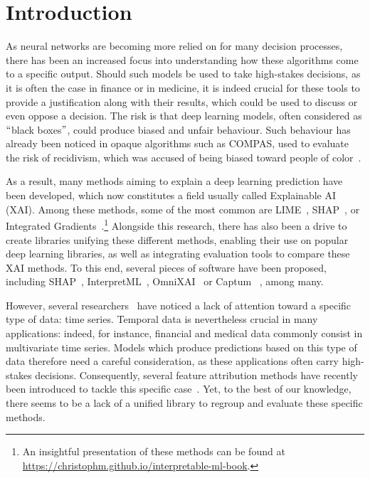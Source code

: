 \section{Introduction}
\label{sec:introduction}

As neural networks are becoming more relied on for many decision processes, there has been an increased focus into
understanding how these algorithms come to a specific output.
Should such models be used to take high-stakes decisions, as it is often the case in finance or in medicine, it is
indeed crucial for these tools to provide a justification along with their results, which could be used to discuss
or even oppose a decision.
The risk is that deep learning models, often considered as $``$black boxes$"$, could produce biased and unfair behaviour.
Such behaviour has already been noticed in opaque algorithms such as COMPAS, used to evaluate the risk of recidivism,
which was accused of being biased toward people of color~\citep{rudin2019stop}.

As a result, many methods aiming to explain a deep learning prediction have been developed, which now constitutes a
field usually called Explainable AI (XAI).
Among these methods, some of the most common are LIME~\citep{ribeiro2016should}, SHAP~\citep{lundberg2017unified},
or Integrated Gradients~\citep{sundararajan2017axiomatic}.\footnote{
    An insightful presentation of these methods can be found at \url{https://christophm.github.io/interpretable-ml-book}.
}
Alongside this research, there has also been a drive to create libraries unifying these different methods, enabling
their use on popular deep learning libraries, as well as integrating evaluation tools to compare these XAI methods.
To this end, several pieces of software have been proposed, including SHAP~\citep{lundberg2017unified},
InterpretML~\citep{nori2019interpretml}, OmniXAI~\citep{wenzhuo2022-omnixai} or Captum~\citep{kokhlikyan2020captum}
, among many.

However, several researchers~\citep{tonekaboni2020went, crabbe2021explaining} have noticed a lack of attention toward
a specific type of data: time series.
Temporal data is nevertheless crucial in many applications: indeed, for instance, financial and medical data commonly
consist in multivariate time series.
Models which produce predictions based on this type of data therefore need a careful consideration, as these
applications often carry high-stakes decisions.
Consequently, several feature attribution methods have recently been introduced to tackle this specific
case~\citep{choi2016retain, tonekaboni2020went, crabbe2021explaining}.
Yet, to the best of our knowledge, there seems to be a lack of a unified library to regroup and evaluate these specific
methods.

